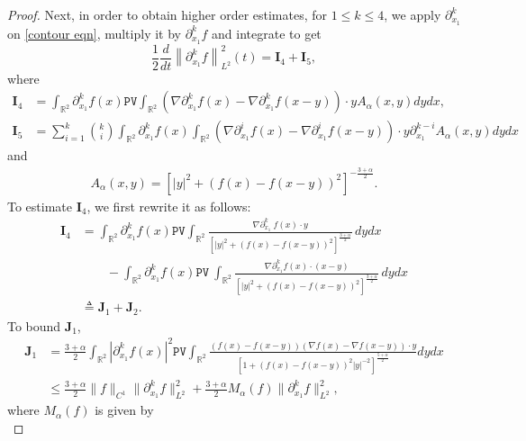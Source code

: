 \documentclass[reqno]{amsart}%
\theoremstyle{definition}
\theoremstyle{remark}
\numberwithin{equation}{section}
\newcommand{\0}{\mathbf{0}}
\newcommand{\1}{\mathbf{1}}
\newcommand{\R}{\mathbb R}
\newcommand{\PV}{\texttt{PV}}
\numberwithin{equation}{section}
\numberwithin{theorem}{section}
\numberwithin{figure}{section}
\begin{document}
\begin{proof}
Next, in order to obtain higher order estimates, for $1\le k\le4$, we apply $\partial_{x_1}^k$ on \eqref{contour eqn}, multiply it by $\partial_{x_1}^k f$ and integrate to get
\begin{equation*}
\frac{1}{2} \frac{d}{dt} \left\|\partial_{x_1}^k f\right\|_{L^2}^2(t) = \mathbf{I}_{4} + \mathbf{I}_{5},
\end{equation*}
where
\begin{align*}
\mathbf{I}_{4}&=\int_{\R^2}\partial_{x_1}^kf(x)\PV\int_{\R^2}(\nabla\partial_{x_1}^kf(x)-\nabla\partial_{x_1}^kf(x-y))\cdot y A_\alpha(x,y)dydx,\\
\mathbf{I}_{5}&=\sum_{i=1}^k{k\choose i}\int_{\R^2}\partial_{x_1}^k f(x)\int_{\R^2}(\nabla\partial_{x_1}^if(x)-\nabla\partial_{x_1}^if(x-y))\cdot y \partial_{x_1}^{k-i}A_\alpha(x,y)dydx
\end{align*}
and
\begin{align*}
A_\alpha(x,y)=\left[ |y|^2 + (f(x) - f(x - y))^2 \right]^{-\frac{3 +\alpha}{2}}.
\end{align*}
To estimate $\mathbf{I}_{4}$, we first rewrite it as follows:
\begin{equation*}
\begin{split}
\mathbf{I}_4 &= \int_{\mathbb{R}^2}\partial_{x_1}^k f(x) \PV  \int_{\mathbb{R}^2} \frac{\nabla \partial_{x_1}^k \ f(x) \cdot y}{\left[ |y|^2 + (f(x) - f(x - y))^2 \right]^{\frac{3 +\alpha}{2}}} \, dydx\\
&\qquad- \int_{\mathbb{R}^2} \partial_{x_1}^k f(x) \PV \ \int_{\mathbb{R}^2} \frac{\nabla \partial_{x_1}^k f(x) \cdot (x - y)}{\left[ |y|^2 + \left(f(x) - f(x - y)\right)^2 \right]^{\frac{3 + \alpha}{2}}} \, dydx\\
&\triangleq \mathbf{J}_1+\mathbf{J}_2.
\end{split}
\end{equation*}
To bound $\mathbf{J}_1$, 
\begin{equation*}
\begin{split}
\mathbf{J}_1 &= \frac{3 + \alpha}{2} \int_{\mathbb{R}^2} | \partial_{x_1}^k f(x) |^2 \PV \int_{\mathbb{R}^2}  \frac{(f(x)-f(x-y))(\nabla f(x)-\nabla f(x-y))\cdot y }{\left[ 1+\left(f(x)-f(x-y)\right)^2|y|^{-2}\right]^{\frac{5 +\alpha}{2}}} dydx \\
&\le \frac{3+\alpha}{2}\|f\|_{C^1}\|\partial_{x_1}^k f\|^2_{L^2}+\frac{3+\alpha}{2}M_\alpha(f)\|\partial_{x_1}^k f\|^2_{L^2},
\end{split}
\end{equation*}
where \( M_\alpha(f) \) is given by
\begin{equation}\label{def of M alpha (f)}

\end{equation}
\end{proof}
\end{document}
